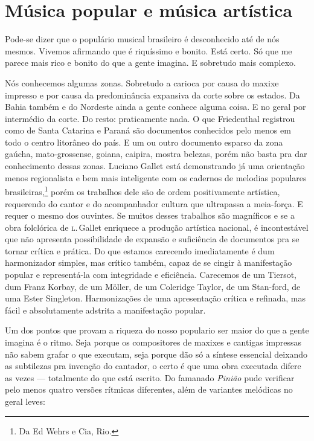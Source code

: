 \section{Música popular e música artística}

Pode-se dizer que o populário musical brasileiro é desconhecido até de
nós mesmos. Vivemos afirmando que é riquíssimo e bonito. Está certo. Só
que me parece mais rico e bonito do que a gente imagina. E sobretudo
mais complexo.

Nós conhecemos algumas zonas. Sobretudo a carioca por causa do maxixe
impresso e por causa da predominância expansiva da corte sobre os
estados. Da Bahia também e do Nordeste ainda a gente conhece alguma
coisa. E no geral por intermédio da corte. Do resto: praticamente nada.
O que Friedenthal registrou como de Santa Catarina e Paraná são
documentos conhecidos pelo menos em todo o centro litorâneo do país. E
um ou outro documento esparso da zona gaúcha, mato-grossense, goiana,
caipira, mostra belezas, porém não basta pra dar conhecimento dessas
zonas. Luciano Gallet está demonstrando já uma orientação menos
regionalista e bem mais inteligente com os cadernos de melodias populares brasileiras,\footnote{Da Ed Wehrs e Cia, Rio.} porém os trabalhos dele são
de ordem positivamente artística, requerendo do cantor e do acompanhador
cultura que ultrapassa a meia-força. E requer o mesmo dos ouvintes. Se
muitos desses trabalhos são magníficos e se a obra folclórica de \textsc{l}.\,Gallet enriquece a produção artística nacional, é incontestável que não
apresenta possibilidade de expansão e suficiência de documentos pra se
tornar crítica e prática. Do que estamos carecendo imediatamente é dum
harmonizador simples, mas crítico também, capaz de se cingir à
manifestação popular e representá-la com integridade e eficiência.
Carecemos de um Tiersot, dum Franz Korbay, de um Möller, de um Coleridge
Taylor, de um Stan-ford, de uma Ester Singleton. Harmonizações de uma
apresentação crítica e refinada, mas fácil e absolutamente adstrita a
manifestação popular.

Um dos pontos que provam a riqueza do nosso populario ser maior do que a
gente imagina é o ritmo. Seja porque os compositores de maxixes e
cantigas impressas não sabem grafar o que executam, seja porque dão só a
síntese essencial deixando as subtilezas pra invenção do cantador, o
certo é que uma obra executada difere as vezes --- totalmente do que
está escrito. Do famanado \emph{Pinião} pude verificar pelo menos quatro
versões rítmicas diferentes, além de variantes melódicas no geral leves:

